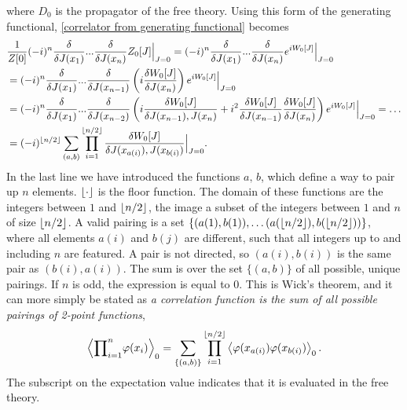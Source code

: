 %
where $D_0$ is the propagator of the free theory.
Using this form of the generating functional, \autoref{correlator from generating functional} becomes
%
\begin{align*}
    & \frac{1}{Z[0]}  (-i)^n\fdv{}{J(x_1)} ... \fdv{}{J(x_n)} Z_0[J]  \Big|_{J = 0}
    = (-i)^n \fdv{}{J(x_1)} ... \fdv{}{J(x_n)} e^{i W_0[J]} \Big|_{J = 0}\\
    & = (-i)^{n} \fdv{}{J(x_1)} ... \fdv{}{J(x_{n-1})} \left(i \fdv{W_0[J]}{ J(x_{n}) } \right) e^{i W_0[J]} \Big|_{J = 0}\\
    & = (-i)^{n}\fdv{}{J(x_1)} ... \fdv{}{J(x_{n-2})}
    \left(
        i\fdv{ W_0[J] }{ J(x_{n-1}), J(x_{n}) }
        + i^2 \fdv{W_0[J]}{J(x_{n-1})} \fdv{W_0[J]}{J(x_{n})}
    \right) 
    e^{i W_0[J]} \Big|_{J = 0}
    = \dots \\
    &= 
    (- i )^{\floor{n/2}}\sum_{{(a, b)}} \prod_{i=1}^{\floor{n/2}}
    \fdv{ W_0[J] }{ J(x_{a(i)}), J(x_{b(i)}) } \Big|_{J = 0}.
\end{align*}
%
In the last line we have introduced the functions $a, \, b$, which define a way to pair up $n$ elements.
$\lfloor\cdot\rfloor$ is the floor function.
The domain of these functions are the integers between $1$ and $\lfloor n/2\rfloor$, the image a subset of the integers between $1$ and $n$ of size $\lfloor n/2\rfloor$.
A valid pairing is a set $\{(a(1), b(1)), \dots (a(\lfloor n/2\rfloor), b(\lfloor n/2\rfloor))\}$, where all elements $a(i)$ and $b(j)$ are different, such that all integers up to and including $n$ are featured.
A pair is not directed, so $(a(i), b(i))$ is the same pair as $(b(i), a(i))$.
The sum is over the set ${\{(a, b)\}}$ of all possible, unique pairings.
If $n$ is odd, the expression is equal to $0$.
This is Wick's theorem, and it can more simply be stated as \emph{a correlation function is the sum of all possible pairings of 2-point functions},
%
\begin{equation}
    \left\langle {\prod}_{i=1}^{n} \varphi(x_i)   \right\rangle_0
    = \sum_{\{(a, b)\}}  \prod_{i=1}^{\lfloor n/2\rfloor}  \left\langle \varphi(x_{a(i)}) \varphi(x_{b(i)}) \right\rangle_0.
\end{equation}
%
The subscript on the expectation value indicates that it is evaluated in the free theory.

